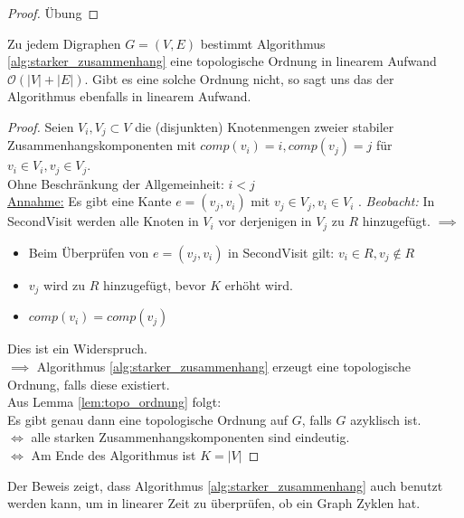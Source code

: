 \begin{proof}
Übung
\end{proof}
\begin{theorem}
	Zu jedem Digraphen $G=(V,E)$  bestimmt Algorithmus \ref{alg:starker_zusammenhang} eine topologische Ordnung in linearem Aufwand $\mathcal{O}(|V|+|E|)$.
	Gibt es eine solche Ordnung nicht, so sagt uns das der Algorithmus ebenfalls in linearem Aufwand.
\end{theorem}
\begin{proof}
Seien $V_i, V_j \subset V$ die (disjunkten) Knotenmengen zweier stabiler Zusammenhangskomponenten mit $comp(v_i)=i, comp(v_j)=j$ für $v_i \in  V_i, v_j \in  V_j$. \\
Ohne Beschränkung der Allgemeinheit: $i<j$\\
\underline{Annahme:} Es gibt eine Kante $e=(v_j,v_i)$ mit $v_j \in  V_j, v_i \in  V_i$ .
\emph{Beobacht:} In SecondVisit werden alle Knoten in $V_i$ vor derjenigen in $V_j$ zu $R$ hinzugefügt. $\implies $ 
\begin{itemize}
	\item Beim Überprüfen von $e=(v_j,v_i)$ in SecondVisit gilt: $v_i \in R, v_j \not\in R$ 
	\item $v_j$  wird zu $R$ hinzugefügt, bevor $K$ erhöht wird.
	\item $comp(v_i)=comp(v_j)$ 
\end{itemize}
Dies ist ein Widerspruch. \\
$\implies $ Algorithmus \ref{alg:starker_zusammenhang} erzeugt eine topologische Ordnung, falls diese existiert. \\
Aus Lemma \ref{lem:topo_ordnung} folgt: \\
Es gibt genau dann eine topologische Ordnung auf $G$, falls $G$ azyklisch ist.\\
$\iff $ alle starken Zusammenhangskomponenten sind eindeutig. \\
$\iff $ Am Ende des Algorithmus ist $K=|V|$ 
\end{proof}
\begin{remark}
Der Beweis zeigt, dass Algorithmus \ref{alg:starker_zusammenhang} auch benutzt werden kann, um in linearer Zeit zu überprüfen, ob ein Graph Zyklen hat.
\end{remark}
